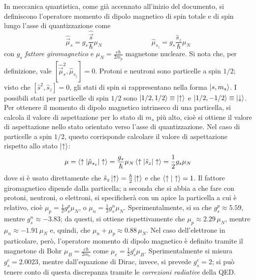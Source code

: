 \documentclass[11pt, a4paper]{scrartcl}
\theoremstyle{style}
\numberwithin{equation}{subsection}
\begin{document}
In meccanica quantistica, come gi\`a accennato all'inizio del documento, si definiscono l'operatore momento di dipolo magnetico di spin totale e di spin lungo l'asse di quantizzazione come
\[
\hat{\vec{\mu }}_s = g_s \frac{\hat{\vec{s}}}{\hbar }\mu _N \hspace{3cm} \hat{\mu }_{s_z} = g_s \frac{\hat{s}_z}{\hbar } \mu _N
\] 
con $g_s$ \textit{fattore giromagnetico} e $\mu _N = \frac{e\hbar }{2m_p}$ magnetone nucleare.
Si nota che, per definizione, vale $[\hat{\vec{\mu }}_s^2 , \hat{\mu }_{s_z}]=0$.
Protoni e neutroni sono particelle a spin $1 / 2$; visto che $[\hat{s}^2 , \hat{s}_z] =0$, gli stati di spin si rappresentano nella forma $\ket{s ,m_s} $.
I possibili stati per particelle di spin $1 / 2$ sono $\ket{1 / 2 , 1 / 2} \equiv \ket{\uparrow} $ e $\ket{1 / 2 , - 1 / 2 }  \equiv \ket{\downarrow} $.
Per ottenere il momento di dipolo magnetico intrinseco di una particella, si calcola il valore di aspettazione per lo stato di $m_s$ pi\`u alto, cio\`e si ottiene il valore di aspettazione nello stato orientato verso l'asse di quantizzazione.
Nel caso di particelle a spin $1 / 2$, questo corrisponde calcolare il valore di aspettazione rispetto allo stato $\ket{\uparrow} $:
\[
\mu = \braket{\uparrow|\hat{\mu }_{s_z}|\uparrow} = \frac{g_s}{\hbar }\mu _N \braket{\uparrow|\hat{s}_z|\uparrow} =\frac{1}{2}g_s \mu _N
\] 
dove si \`e usato direttamente che $\hat{s}_z \ket{\uparrow}  =\frac{\hbar}{2}\ket{\uparrow} $ e che $\braket{\uparrow|\uparrow} =1$.
Il fattore giromagnetico dipende dalla particella; a seconda che si abbia a che fare con protoni, neutroni, o elettroni, si specificher\`a con un apice la particella a cui \`e relativo, cio\`e $\mu _p = \frac{1}{2}g_s^p \mu _N$, o $\mu _n = \frac{1}{2} g_s^n \mu _N$.
Sperimentalmente, si sa che $g_s^p \approx 5.59$, mentre $g_s^n \approx - 3.83$; da questi, si ottiene rispettivamente che $\mu _p \approx 2.29\,  \mu _N$, mentre $\mu _n \approx -1.91 \, \mu _N$ e, quindi, che $\mu _n + \mu _p \approx 0.88\, \mu _N$.
Nel caso dell'elettrone in particolare, per\`o, l'operatore momento di dipolo magnetico \`e definito tramite il magnetone di Bohr $\mu _B = \frac{e \hbar }{2m_e}$ come $\mu _e = \frac{1}{2}g_s^e \mu _B$.
Sperimentalmente si misura $g_s^e = 2.0023$, mentre dall'equazione di Dirac, invece, si prevede $g_s^e = 2$; si pu\`o tenere conto di questa discrepanza tramite le \textit{correzioni radiative} della QED.
\end{document}
